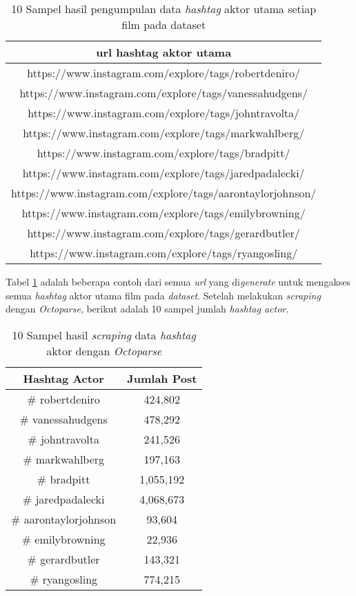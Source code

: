 \begin{table}[H]
\caption{10 Sampel hasil pengumpulan data \textit{hashtag} aktor utama setiap film pada dataset}
\centering
\begin{tabular}{|c|}
\hline 
url hashtag aktor utama  \\ 
\hline 
 https://www.instagram.com/explore/tags/robertdeniro/  \\ 
\hline 
 https://www.instagram.com/explore/tags/vanessahudgens/  \\ 
\hline 
 https://www.instagram.com/explore/tags/johntravolta/  \\ 
\hline 
 https://www.instagram.com/explore/tags/markwahlberg/  \\ 
\hline 
https://www.instagram.com/explore/tags/bradpitt/  \\ 
\hline 
https://www.instagram.com/explore/tags/jaredpadalecki/  \\ 
\hline 
https://www.instagram.com/explore/tags/aarontaylorjohnson/  \\ 
\hline 
https://www.instagram.com/explore/tags/emilybrowning/  \\ 
\hline 
https://www.instagram.com/explore/tags/gerardbutler/  \\ 
\hline 
https://www.instagram.com/explore/tags/ryangosling/  \\ 
\hline 
\end{tabular} 

\label{tab:10sampel_urlscrapaktorhashtag}
\end{table}

Tabel \ref{tab:10sampel_urlscrapaktorhashtag} adalah beberapa contoh dari semua \textit{url} yang di\textit{generate} untuk mengakses semua \textit{hashtag} aktor utama film pada \textit{dataset}. Setelah melakukan \textit{scraping} dengan \textit{Octoparse}, berikut adalah 10 sampel jumlah \textit{hashtag actor}.

\begin{table}[H]
\centering
\caption{10 Sampel hasil \textit{scraping} data \textit{hashtag} aktor dengan \textit{Octoparse} }
\begin{tabular}{|c|c|}
\hline 
Hashtag Actor & Jumlah Post \\ 
\hline 
\# robertdeniro & 424,802 \\ 
\hline 
\# vanessahudgens & 478,292 \\ 
\hline 
\# johntravolta & 241,526 \\ 
\hline 
\# markwahlberg & 197,163 \\ 
\hline 
\# bradpitt & 1,055,192 \\ 
\hline 
\# jaredpadalecki & 4,068,673 \\ 
\hline 
\# aarontaylorjohnson & 93,604 \\ 
\hline 
\# emilybrowning & 22,936 \\ 
\hline 
\# gerardbutler & 143,321 \\ 
\hline 
\# ryangosling & 774,215 \\ 
\hline 
\end{tabular} 

\label{tab:10sampel_hasilscrapactorhashtag}
\end{table}
 

